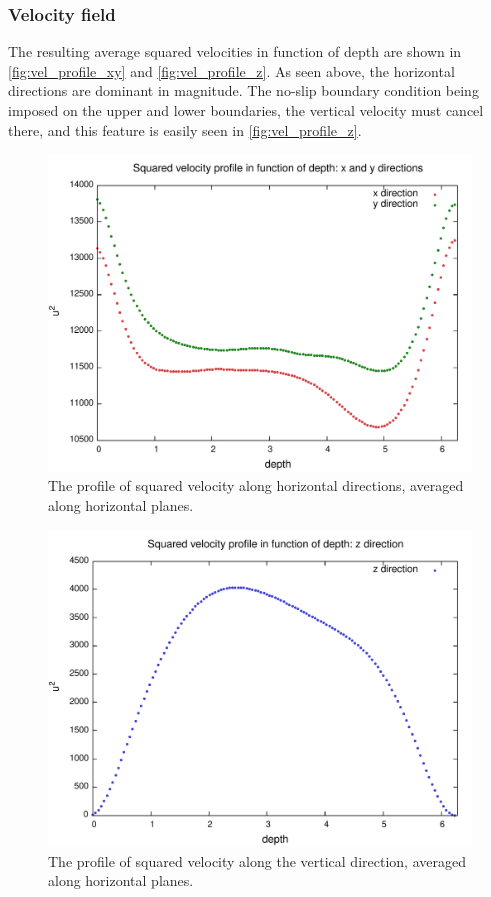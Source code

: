     
\subsubsection{Velocity field}
The resulting average squared velocities in function of depth are shown in \autoref{fig:vel_profile_xy} and \autoref{fig:vel_profile_z}. As seen above, the horizontal directions are dominant in magnitude. The no-slip boundary condition being imposed on the upper and lower boundaries, the vertical velocity must cancel there, and this feature is easily seen in \autoref{fig:vel_profile_z}.
    
\begin{figure} [ht]
    \includegraphics[width=\textwidth]{data/3D_model/run2/velocity_profile_xy}
    \caption{The profile of squared velocity along horizontal directions, averaged along horizontal planes.}
    \label{fig:vel_profile_xy}
\end{figure}

\begin{figure} [ht]
    \includegraphics[width=\textwidth]{data/3D_model/run2/velocity_profile_z}
    \caption{The profile of squared velocity along the vertical direction, averaged along horizontal planes.}
    \label{fig:vel_profile_z}
\end{figure}


